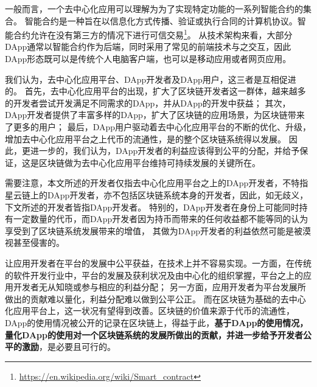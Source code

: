 一般而言，一个去中心化应用可以理解为为了实现特定功能的一系列智能合约的集合。
智能合约是一种旨在以信息化方式传播、验证或执行合同的计算机协议。智能合约允许在没有第三方的情况下进行可信交易\footnote{\url{https://en.wikipedia.org/wiki/Smart\_contract}}。
从技术架构来看，大部分DApp通常以智能合约作为后端，同时采用了常见的前端技术与之交互，因此DApp形态既可以是传统个人电脑客户端，也可以是移动应用或者网页应用。

我们认为，去中心化应用平台、DApp开发者及DApp用户，这三者是互相促进的。
首先，去中心化应用平台的出现，扩大了区块链开发者这一群体，越来越多的开发者尝试开发满足不同需求的DApp，并从DApp的开发中获益；
其次，DApp开发者提供了丰富多样的DApp，扩大了区块链的应用场景，为区块链带来了更多的用户；
最后，DApp用户驱动着去中心化应用平台的不断的优化、升级，增加去中心化应用平台之上代币的流通性，是的整个区块链系统得以发展。
因此，更进一步的，我们认为，DApp开发者的利益应该得到公平的分配，并给予保证，这是区块链做为去中心化应用平台维持可持续发展的关键所在。

需要注意，本文所述的开发者仅指去中心化应用平台之上的DApp开发者，不特指星云链上的DApp开发者，亦不包括区块链系统本身的开发者，因此，如无歧义，下文所述的开发者皆指DApp开发者。
特别的，DApp开发者在身份上可能同时持有一定数量的代币，而DApp开发者因为持币而带来的任何收益都不能等同的认为享受到了区块链系统发展带来的增值，
其做为DApp开发者的利益依然可能是被漠视甚至侵害的。


让应用开发者在平台的发展中公平获益，在技术上并不容易实现。一方面，在传统的软件开发行业中，平台的发展及获利状况及由中心化的组织掌握，平台之上的应用开发者无从知晓或参与相应的利益分配；
另一方面，应用开发者为平台发展所做出的贡献难以量化，利益分配难以做到公平公正。
而在区块链为基础的去中心化应用平台上，这一状况有望得到改善。区块链的价值来源于代币的流通性，DApp的使用情况被公开的记录在区块链上，得益于此，\textbf{基于DApp的使用情况，
量化DApp的使用对一个区块链系统的发展所做出的贡献，并进一步给予开发者公平的激励}，是必要且可行的。

